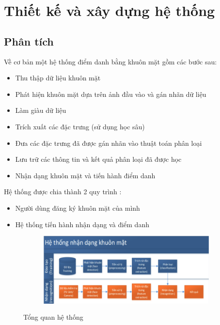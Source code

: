 \chapter{Thiết kế và xây dựng hệ thống}
\label{cha:chap3}

\section{Phân tích}
Về cơ bản một hệ thống điểm danh bằng khuôn mặt gồm các bước sau:
\begin{itemize}
    \item Thu thập dữ liệu khuôn mặt
    \item Phát hiện khuôn mặt dựa trên ảnh đầu vào và gán nhãn dữ liệu
    \item Làm giàu dữ liệu
    \item Trích xuất các đặc trưng (sử dụng học sâu)
    \item Đưa các đặc trưng đã được gán nhãn vào thuật toán phân loại
    \item Lưu trữ các thông tin và kết quả phân loại đã được học
    \item Nhận dạng khuôn mặt và tiến hành điểm danh
\end{itemize}

Hệ thống được chia thành 2 quy trình :
\begin{itemize}
    \item Người dùng đăng ký khuôn mặt của mình
    \item Hệ thống tíến hành nhận dạng và điểm danh
\end{itemize}

\begin{figure}
    \begin{subfigure}{1.\textwidth}
        \includegraphics[width=1.\linewidth]{Chapters/items/chap3_1.jpg}
        \label{fig:chap3_1}
    \end{subfigure}
    \caption{Tổng quan hệ thống}
\end{figure}


